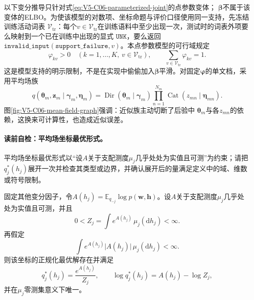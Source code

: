 以下变分推导只针对式\eqref{eq:V5-C06-parameterized-joint}的点参数变体；
$\boldsymbol\beta$不属于该变体的ELBO。为使该模型的对数项、坐标命题与评价口径使用同一支持，先冻结训练活动词表
$\mathcal V_{\mathrm{tr}}$：每个$v\in\mathcal V_{\mathrm{tr}}$在训练语料中至少出现一次，测试时的词表外项要么映射到一个已在训练中出现的显式
$\mathtt{UNK}$，要么返回$\mathtt{invalid\_input}(\mathtt{support\_failure},v)$。本点参数模型的可行域规定
\[
\varphi_{kv}>0\quad(k=1,\ldots,K,\ v\in\mathcal V_{\mathrm{tr}}),
\qquad \sum_{v\in\mathcal V_{\mathrm{tr}}}\varphi_{kv}=1.
\]
这是模型支持的明示限制，不是在实现中偷偷加入$\boldsymbol\beta$平滑。对固定$\boldsymbol\varphi$的单文档，采用平均场族
\begin{equation}
q(\boldsymbol\theta_m,\boldsymbol z_m
\mid\boldsymbol\gamma_m,\boldsymbol\eta_m)
=\operatorname{Dir}(\boldsymbol\theta_m\mid\boldsymbol\gamma_m)
\prod_{n=1}^{N_m}\operatorname{Cat}(z_{mn}\mid\boldsymbol\eta_{mn}).
\label{eq:V5-C06-mean-field}
\end{equation}
图\ref{fig:V5-C06-mean-field-graph}强调：近似族主动切断了后验中
$\boldsymbol\theta_m$与各$z_{mn}$的依赖，这换来可计算性，也造成近似误差。


\paragraph{读前自检：平均场坐标最优形式。}平均场坐标最优形式以“设$A$关于支配测度$\mu_j$几乎处处为实值且可测”为约束；请把$q_j^*(h_j)$展开一次并检查其类型或边界，并确认展开后的量满足定义中的域、维数或符号限制。\par

\begin{proposition}[平均场坐标最优形式]\label{prop:V5-C06-mean-field-coordinate}
固定其他变分因子，令$A(h_j)=\mathbb E_{q_{-j}}\log p(\boldsymbol w,\boldsymbol h)$。设$A$关于支配测度$\mu_j$几乎处处为实值且可测，并且
\[
0<Z_j=\int e^{A(h_j)}\,\mu_j(\mathrm dh_j)<\infty.
\]
再假定
\[
\int e^{A(h_j)}\lvert A(h_j)\rvert\,\mu_j(\mathrm dh_j)<\infty.
\]
则该坐标的正规化最优解存在并满足
\begin{equation}
q_j^*(h_j)=\frac{e^{A(h_j)}}{Z_j},
\qquad
\log q_j^*(h_j)=A(h_j)-\log Z_j,
\label{eq:V5-C06-coordinate-general}
\end{equation}
并在$\mu_j$零测集意义下唯一。
\end{proposition}
